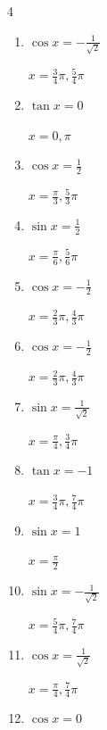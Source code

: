 \begin{multicols}{4}
\begin{enumerate}
  \item $\displaystyle \cos{x}  = -\frac{1}{\sqrt{2}}$

        $\displaystyle x = \frac{3}{4}\pi , \frac{5}{4}\pi$

  \item $\displaystyle \tan{x}  = 0$

        $\displaystyle x = 0 , \pi$

  \item $\displaystyle \cos{x}  = \frac{1}{2}$

        $\displaystyle x = \frac{\pi}{3} , \frac{5}{3}\pi$

  \item $\displaystyle \sin{x}  = \frac{1}{2}$

        $\displaystyle x = \frac{\pi}{6} , \frac{5}{6}\pi$

\columnbreak %

  \item $\displaystyle \cos{x}  = -\frac{1}{2}$

        $\displaystyle x = \frac{2}{3}\pi , \frac{4}{3}\pi$

  \item $\displaystyle \cos{x}  = -\frac{1}{2}$

        $\displaystyle x = \frac{2}{3}\pi , \frac{4}{3}\pi$

  \item $\displaystyle \sin{x}  = \frac{1}{\sqrt{2}}$

        $\displaystyle x = \frac{\pi}{4} , \frac{3}{4}\pi$

  \item $\displaystyle \tan{x}  = -1$

        $\displaystyle x = \frac{3}{4}\pi , \frac{7}{4}\pi$

  \item $\displaystyle \sin{x}  = 1$

        $\displaystyle x = \frac{\pi}{2}$

  \item $\displaystyle \sin{x}  = -\frac{1}{\sqrt{2}}$

        $\displaystyle x = \frac{5}{4}\pi , \frac{7}{4}\pi$

  \item $\displaystyle \cos{x}  = \frac{1}{\sqrt{2}}$

        $\displaystyle x = \frac{\pi}{4} , \frac{7}{4}\pi$

  \item $\displaystyle \cos{x}  = 0$


\end{enumerate}
\end{multicols}
